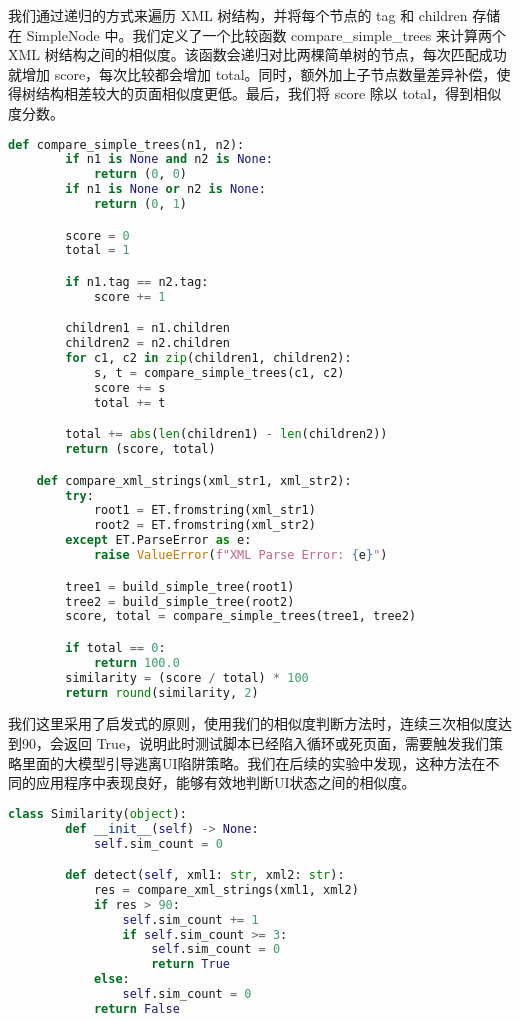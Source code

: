 \documentclass{article}
\begin{document}
我们通过递归的方式来遍历 XML 树结构，并将每个节点的 tag 和 children 存储在 SimpleNode 中。我们定义了一个比较函数 compare\_simple\_trees 来计算两个 XML 树结构之间的相似度。该函数会递归对比两棵简单树的节点，每次匹配成功就增加 score，每次比较都会增加 total。同时，额外加上子节点数量差异补偿，使得树结构相差较大的页面相似度更低。最后，我们将 score 除以 total，得到相似度分数。

\begin{lstlisting}[language=python, caption=相似度计算]
    def compare_simple_trees(n1, n2):
        if n1 is None and n2 is None:
            return (0, 0)
        if n1 is None or n2 is None:
            return (0, 1)

        score = 0
        total = 1

        if n1.tag == n2.tag:
            score += 1

        children1 = n1.children
        children2 = n2.children
        for c1, c2 in zip(children1, children2):
            s, t = compare_simple_trees(c1, c2)
            score += s
            total += t

        total += abs(len(children1) - len(children2))
        return (score, total)

    def compare_xml_strings(xml_str1, xml_str2):
        try:
            root1 = ET.fromstring(xml_str1)
            root2 = ET.fromstring(xml_str2)
        except ET.ParseError as e:
            raise ValueError(f"XML Parse Error: {e}")

        tree1 = build_simple_tree(root1)
        tree2 = build_simple_tree(root2)
        score, total = compare_simple_trees(tree1, tree2)

        if total == 0:
            return 100.0
        similarity = (score / total) * 100
        return round(similarity, 2)
\end{lstlisting}

我们这里采用了启发式的原则，使用我们的相似度判断方法时，连续三次相似度达到90，会返回 True，说明此时测试脚本已经陷入循环或死页面，需要触发我们策略里面的大模型引导逃离UI陷阱策略。我们在后续的实验中发现，这种方法在不同的应用程序中表现良好，能够有效地判断UI状态之间的相似度。

\begin{lstlisting}[language=python, caption=相似度检测]
    class Similarity(object):
        def __init__(self) -> None:
            self.sim_count = 0

        def detect(self, xml1: str, xml2: str):
            res = compare_xml_strings(xml1, xml2)
            if res > 90:
                self.sim_count += 1
                if self.sim_count >= 3:
                    self.sim_count = 0
                    return True
            else:
                self.sim_count = 0
            return False
\end{lstlisting}
\end{document}
